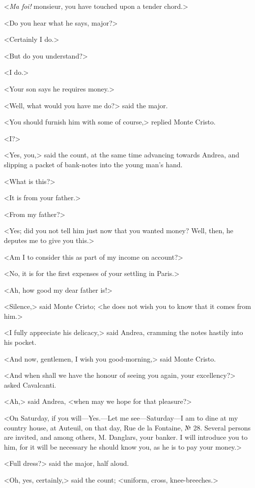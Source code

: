 <\textit{Ma foi!} monsieur, you have touched upon a tender chord.> 

 <Do you hear what he says, major?> 

 <Certainly I do.> 

 <But do you understand?> 

 <I do.> 

 <Your son says he requires money.> 

 <Well, what would you have me do?> said the major. 

 <You should furnish him with some of course,> replied Monte Cristo. 

 <I?> 

 <Yes, you,> said the count, at the same time advancing towards Andrea, and slipping a packet of bank-notes into the young man's hand. 

 <What is this?> 

 <It is from your father.> 

 <From my father?> 

 <Yes; did you not tell him just now that you wanted money? Well, then, he deputes me to give you this.> 

 <Am I to consider this as part of my income on account?> 

 <No, it is for the first expenses of your settling in Paris.> 

 <Ah, how good my dear father is!> 

 <Silence,> said Monte Cristo; <he does not wish you to know that it comes from him.> 

 <I fully appreciate his delicacy,> said Andrea, cramming the notes hastily into his pocket. 

 <And now, gentlemen, I wish you good-morning,> said Monte Cristo. 

 <And when shall we have the honour of seeing you again, your excellency?> asked Cavalcanti. 

 <Ah,> said Andrea, <when may we hope for that pleasure?> 

 <On Saturday, if you will—Yes.—Let me see—Saturday—I am to dine at my country house, at Auteuil, on that day, Rue de la Fontaine, № 28. Several persons are invited, and among others, M. Danglars, your banker. I will introduce you to him, for it will be necessary he should know you, as he is to pay your money.> 

 <Full dress?> said the major, half aloud. 

 <Oh, yes, certainly,> said the count; <uniform, cross, knee-breeches.> 

